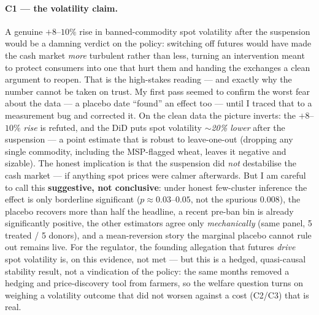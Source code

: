 \documentclass[11pt]{article}
\begin{document}
\paragraph{C1 --- the volatility claim.} A genuine $+8$--$10\%$ rise in banned-commodity
spot volatility after the suspension would be a damning verdict on the policy: switching off
futures would have made the cash market \emph{more} turbulent rather than less, turning an
intervention meant to protect consumers into one that hurt them and handing the exchanges a
clean argument to reopen. That is the high-stakes reading --- and exactly why the number
cannot be taken on trust. My first pass seemed to confirm the worst fear about the data --- a
placebo date ``found'' an effect too --- until I traced that to a measurement bug and corrected
it. On the clean data the picture inverts: the $+8$--$10\%$ \emph{rise} is refuted, and the
DiD puts spot volatility \emph{$\sim$20\% lower} after the suspension --- a point estimate that
is robust to leave-one-out (dropping any single commodity, including the MSP-flagged wheat,
leaves it negative and sizable). The honest implication is that the suspension did \emph{not}
destabilise the cash market --- if anything spot prices were calmer afterwards. But I am
careful to call this \textbf{suggestive, not conclusive}: under honest few-cluster inference
the effect is only borderline significant ($p\approx0.03$--$0.05$, not the spurious $0.008$),
the placebo recovers more than half the headline, a recent pre-ban bin is already significantly
positive, the other estimators agree only \emph{mechanically} (same panel, 5 treated / 5
donors), and a mean-reversion story the marginal placebo cannot rule out remains live. For the
regulator, the founding allegation that futures \emph{drive} spot volatility is, on this
evidence, not met --- but this is a hedged, quasi-causal stability result, not a vindication of
the policy: the same months removed a hedging and price-discovery tool from farmers, so the
welfare question turns on weighing a volatility outcome that did not worsen against a cost
(C2/C3) that is real.
\end{document}
